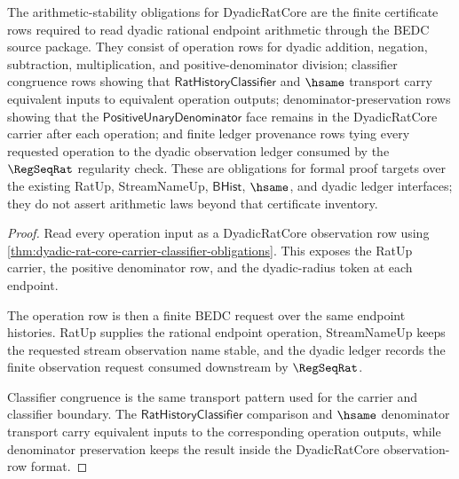 \begin{theorem}
\label{thm:dyadic-rat-core-arithmetic-stability-obligations}
The arithmetic-stability obligations for DyadicRatCore are the finite
certificate rows required to read dyadic rational endpoint arithmetic through
the BEDC source package. They consist of operation rows for dyadic addition,
negation, subtraction, multiplication, and positive-denominator division;
classifier congruence rows showing that $\mathsf{RatHistoryClassifier}$ and
$\hsame$ transport carry equivalent inputs to equivalent operation outputs;
denominator-preservation rows showing that the
$\mathsf{PositiveUnaryDenominator}$ face remains in the DyadicRatCore carrier
after each operation; and finite ledger provenance rows tying every requested
operation to the dyadic observation ledger consumed by the $\RegSeqRat$
regularity check. These are obligations for formal proof targets over the
existing RatUp, StreamNameUp, $\mathsf{BHist}$, $\hsame$, and dyadic ledger
interfaces; they do not assert arithmetic laws beyond that certificate
inventory.
\end{theorem}
\begin{proof}
Read every operation input as a DyadicRatCore observation row using
\autoref{thm:dyadic-rat-core-carrier-classifier-obligations}. This exposes the
RatUp carrier, the positive denominator row, and the dyadic-radius token at
each endpoint.

The operation row is then a finite BEDC request over the same endpoint
histories. RatUp supplies the rational endpoint operation, StreamNameUp keeps
the requested stream observation name stable, and the dyadic ledger records the
finite observation request consumed downstream by $\RegSeqRat$.

Classifier congruence is the same transport pattern used for the carrier and
classifier boundary. The $\mathsf{RatHistoryClassifier}$ comparison and
$\hsame$ denominator transport carry equivalent inputs to the corresponding
operation outputs, while denominator preservation keeps the result inside the
DyadicRatCore observation-row format.
\end{proof}

